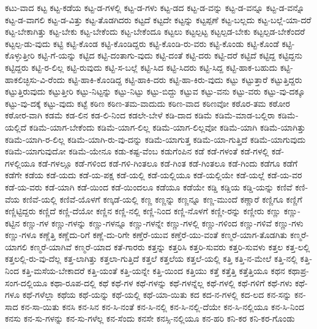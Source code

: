 {ಕಟು-ವಾದ
ಕಟ್ಟ
ಕಟ್ಟ-ಕಡೆಯ
ಕಟ್ಟ-ಡ-ಗಳಲ್ಲಿ
ಕಟ್ಟ-ಡ-ಗಳು
ಕಟ್ಟ-ಡದ
ಕಟ್ಟ-ಡ-ವನ್ನು
ಕಟ್ಟ-ಡ-ವನ್ನೂ
ಕಟ್ಟ-ಡ-ವನ್ನೊ
ಕಟ್ಟ-ಡ-ವಾಗಲಿ
ಕಟ್ಟ-ಡ-ವಿತ್ತು
ಕಟ್ಟ-ತೊಡಗಿದರು
ಕಟ್ಟದೆ
ಕಟ್ಟದೇ
ಕಟ್ಟನ್ನು
ಕಟ್ಟಪ್ಪಣೆ
ಕಟ್ಟ-ಬಲ್ಲದು
ಕಟ್ಟ-ಬಲ್ಲೆ-ಯಾ-ದರೆ
ಕಟ್ಟ-ಬೇಕಾಗಿತ್ತು
ಕಟ್ಟ-ಬೇಕು
ಕಟ್ಟ-ಬೇಕೆಂದು
ಕಟ್ಟ-ಬೇಕೆಂದೂ
ಕಟ್ಟಲು
ಕಟ್ಟಲ್ಪಟ್ಟ
ಕಟ್ಟಲ್ಪಡ-ಬೇಕು
ಕಟ್ಟಲ್ಪಡ-ಬೇಕೆಂದರೆ
ಕಟ್ಟಲ್ಪ-ಡು-ವುದು
ಕಟ್ಟಿ
ಕಟ್ಟಿ-ಕೊಂಡ
ಕಟ್ಟಿ-ಕೊಂಡಿದ್ದರು
ಕಟ್ಟಿ-ಕೊಂಡಿ-ರು-ವರು
ಕಟ್ಟಿ-ಕೊಂಡು
ಕಟ್ಟಿ-ಕೊಂಡೆ
ಕಟ್ಟಿ-ಕೊಳ್ಳುತ್ತೀರಿ
ಕಟ್ಟಿ-ಗೆ-ಯನ್ನು
ಕಟ್ಟಿದ
ಕಟ್ಟಿ-ದಂತಾಗು-ವುದು
ಕಟ್ಟಿ-ದಂತೆ
ಕಟ್ಟಿ-ದರು
ಕಟ್ಟಿ-ದರೆ
ಕಟ್ಟಿದೆ
ಕಟ್ಟಿದ್ದ
ಕಟ್ಟಿದ್ದನು
ಕಟ್ಟಿದ್ದರು
ಕಟ್ಟಿ-ರ-ಲಿಲ್ಲ
ಕಟ್ಟಿ-ರುವುದು
ಕಟ್ಟಿ-ಸ-ಬಲ್ಲೆ
ಕಟ್ಟಿ-ಸಿದ
ಕಟ್ಟಿ-ಸಿದರು
ಕಟ್ಟಿ-ಸಿದ್ದ
ಕಟ್ಟಿ-ಹಾಕ-ಬಹುದು
ಕಟ್ಟಿ-ಹಾಕಲಿಚ್ಛಿಸು-ವಿ-ರೆಂದು
ಕಟ್ಟಿ-ಹಾಕಿ-ಕೊಂಡಿದ್ದ
ಕಟ್ಟಿ-ಹಾಕಿ-ದರು
ಕಟ್ಟಿ-ಹಾ-ಕಿರು-ವುದು
ಕಟ್ಟು
ಕಟ್ಟುತ್ತಾರೆ
ಕಟ್ಟುತ್ತಿದ್ದರು
ಕಟ್ಟುತ್ತಿರುವುದು
ಕಟ್ಟುತ್ತೀರಿ
ಕಟ್ಟು-ನಿಟ್ಟನ್ನು
ಕಟ್ಟು-ನಿಟ್ಟು
ಕಟ್ಟು-ಬಿದ್ದು
ಕಟ್ಟುವ
ಕಟ್ಟು-ವನು
ಕಟ್ಟು-ವರು
ಕಟ್ಟು-ವು-ದಕ್ಕೂ
ಕಟ್ಟು-ವು-ದಕ್ಕೆ
ಕಟ್ಟು-ವುದು
ಕಟ್ಟೆ
ಕಠಿಣ
ಕಠಿಣ-ತಮ-ವಾದುದು
ಕಠಿಣ-ವಾದ
ಕಠಿಣವೋ
ಕಠೊರ-ತಮ
ಕಠೋರ
ಕಠೋರ-ವಾಗಿ
ಕಡಮೆ
ಕಡ-ಲಿನ
ಕಡ-ಲಿ-ನಿಂದ
ಕಡಲೇ-ಬೇಳೆ
ಕಡಿ-ದಾದ
ಕಡಿಮೆ
ಕಡಿಮೆ-ಮಾಡ-ಬಲ್ಲಿರಾ
ಕಡಿಮೆ-ಯಲ್ಲಿದೆ
ಕಡಿಮೆ-ಯಾಗ-ಬೇಕೆಂದು
ಕಡಿಮೆ-ಯಾಗ-ಲಿಲ್ಲ
ಕಡಿಮೆ-ಯಾಗ-ಲಿಲ್ಲವೋ
ಕಡಿಮೆ-ಯಾಗಿ
ಕಡಿಮೆ-ಯಾಗಿತ್ತು
ಕಡಿಮೆ-ಯಾಗಿ-ರ-ಲಿಲ್ಲ
ಕಡಿಮೆ-ಯಾಗಿ-ರು-ವು-ದನ್ನು
ಕಡಿಮೆ-ಯಾಗುತ್ತ
ಕಡಿಮೆ-ಯಾ-ಗುತ್ತಿದೆ
ಕಡಿಮೆ-ಯಾಗುವುದು
ಕಡಿಮೆ-ಯಾಗುವುದೋ
ಕಡಿಮೆ-ಯೇನೂ
ಕಡು-ಕಷ್ಟ-ವೆಂಬ
ಕಡುಗೆಂಪಿನ
ಕಡೆ
ಕಡೆ-ಗಳಂತೆ
ಕಡೆ-ಗಳಲ್ಲಿ
ಕಡೆ-ಗಳಲ್ಲಿಯೂ
ಕಡೆ-ಗಳಲ್ಲೂ
ಕಡೆ-ಗಳಿಂದ
ಕಡೆ-ಗಳಿ-ಗಿಂತಲೂ
ಕಡೆ-ಗಿಂತ
ಕಡೆ-ಗಿಂತಲೂ
ಕಡೆ-ಗಿಂದು
ಕಡೆಗೂ
ಕಡೆಗೆ
ಕಡೆಗೇ
ಕಡೆಯ
ಕಡೆ-ಯದು
ಕಡೆ-ಯ-ಪಕ್ಷ
ಕಡೆ-ಯಲ್ಲಿ
ಕಡೆ-ಯಲ್ಲಿಯೂ
ಕಡೆ-ಯಲ್ಲಿಯೇ
ಕಡೆ-ಯಲ್ಲೆ
ಕಡೆ-ಯ-ವರ
ಕಡೆ-ಯ-ವರು
ಕಡೆ-ಯಾಗಿ
ಕಡೆ-ಯಿಂದ
ಕಡೆ-ಯಿಂದಲೂ
ಕಡೆಯೂ
ಕಡೆಯೇ
ಕಡ್ಡಿ
ಕಡ್ಡಿಯ
ಕಡ್ಡಿ-ಯನ್ನು
ಕಣಿವೆ
ಕಣಿ-ವೆಯ
ಕಣಿವೆ-ಯಲ್ಲಿ
ಕಣಿವೆ-ಯೊಳಗೆ
ಕಣ್ಕಡೆ-ಯಲ್ಲಿ
ಕಣ್ಣ
ಕಣ್ಣನ್ನು
ಕಣ್ಣನ್ನೂ
ಕಣ್ಣ-ಮುಂದೆ
ಕಣ್ಣಾರೆ
ಕಣ್ಣಿಗೂ
ಕಣ್ಣಿಗೆ
ಕಣ್ಣಿಟ್ಟಿದ್ದರು
ಕಣ್ಣಿದೆ
ಕಣ್ಣಿ-ದೆಯೋ
ಕಣ್ಣಿನ
ಕಣ್ಣಿ-ನಲ್ಲಿ
ಕಣ್ಣಿ-ನಿಂದ
ಕಣ್ಣಿ-ನೊಳಗೆ
ಕಣ್ಣೀ-ರನ್ನು
ಕಣ್ಣೀರು
ಕಣ್ಣು
ಕಣ್ಣು-ಕಟ್ಟಿನ
ಕಣ್ಣು-ಗಳ
ಕಣ್ಣು-ಗಳನ್ನು
ಕಣ್ಣು-ಗಳನ್ನೂ
ಕಣ್ಣು-ಗಳನ್ನೇ
ಕಣ್ಣು-ಗಳಲ್ಲಿ
ಕಣ್ಣು-ಗಳಿಂದ
ಕಣ್ಣು-ಗಳಿವೆ
ಕಣ್ಣು-ಗಳು
ಕಣ್ಣು-ಗಳೂ
ಕಣ್ಣೆತ್ತಿ
ಕಣ್ಣೆದು-ರಿಗೆ
ಕಣ್ಣೆ-ದು-ರಿಗೇ
ಕಣ್ತೆರೆ-ಯುವ
ಕಣ್ತೆರೆ-ಯು-ವಂತೆ
ಕಣ್ಮರೆ-ಯಾಗ-ತೊಡಗಿತು
ಕಣ್ಮರೆ-ಯಾಗಲಿ
ಕಣ್ಮರೆ-ಯಾಗಿವೆ
ಕಣ್ಮರೆ-ಯಾದ
ಕತೆ-ಗಾರರು
ಕತ್ತನ್ನು
ಕತ್ತರಿಸಿ
ಕತ್ತರಿ-ಸುವರು
ಕತ್ತರಿ-ಸುವಳು
ಕತ್ತಲ
ಕತ್ತ-ಲಲ್ಲಿ
ಕತ್ತಲಲ್ಲಿ-ರು-ವು-ದೆಲ್ಲ
ಕತ್ತ-ಲಾಗಿತ್ತು
ಕತ್ತಲಾ-ಗುತ್ತಿದೆ
ಕತ್ತಲೆ
ಕತ್ತಲೆಯ
ಕತ್ತಲೆ-ಯಲ್ಲಿ
ಕತ್ತಿ
ಕತ್ತಿ-ನ-ಮೇಲೆ
ಕತ್ತಿ-ನಲ್ಲಿ
ಕತ್ತಿ-ನಿಂದ
ಕತ್ತಿ-ಮಸೆಯ-ಬೇಕಾದರೆ
ಕತ್ತಿ-ಯಂತೆ
ಕತ್ತಿ-ಯನ್ನೇ
ಕತ್ತಿ-ಯಿಂದ
ಕತ್ತಿಯು
ಕತ್ತೆ
ಕತ್ತೆತ್ತಿ
ಕತ್ತೆತ್ತಿಯೂ
ಕಥನ
ಕಥಾಪ್ರ-ಸಂಗ-ದಲ್ಲಿಯೂ
ಕಥಾ-ರೂಪ-ದಲ್ಲಿ
ಕಥೆ
ಕಥೆ-ಗಳ
ಕಥೆ-ಗಳನ್ನು
ಕಥೆ-ಗಳನ್ನೆಲ್ಲ
ಕಥೆ-ಗಳಲ್ಲಿ
ಕಥೆ-ಗಳಿಗೆ
ಕಥೆ-ಗಳು
ಕಥೆ-ಗಳೂ
ಕಥೆ-ಗಳೆಲ್ಲಾ
ಕಥೆಯ
ಕಥೆ-ಯನ್ನು
ಕಥೆ-ಯಲ್ಲಿ
ಕಥೆ-ಯಾ-ಯಿತು
ಕದ
ಕದ-ನ-ಗಳಲ್ಲಿ
ಕದ-ಲದ
ಕನ-ಸನ್ನು
ಕನ-ಸಾದ
ಕನ-ಸಾ-ಯಿತು
ಕನಸಿ
ಕನ-ಸಿನ
ಕನ-ಸಿ-ನಂತೆ
ಕನ-ಸಿ-ನಲ್ಲಿ
ಕನ-ಸಿ-ನಲ್ಲಿ-ದೆಯೇ
ಕನ-ಸಿ-ನಲ್ಲಿಯೂ
ಕನ-ಸಿ-ನಿಂದ
ಕನಸು
ಕನ-ಸು-ಗಳನ್ನು
ಕನ-ಸು-ಗಳೆಲ್ಲ
ಕನ-ಸೆಂದು
ಕನಸೇ
ಕನಸ್ಸಿ-ನಲ್ಲಿಯೂ
ಕನ-ಹರಿ
ಕನಿ-ಕರ
ಕನಿ-ಕರ-ಗೊಂಡು
}
